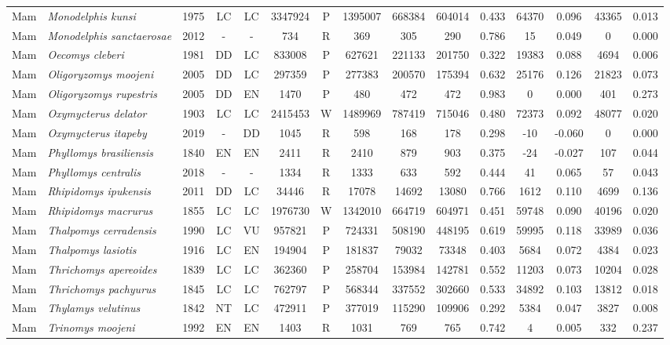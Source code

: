 \documentclass[12pt,openright,oneside,a4paper,english]{abntex2}
\begin{document}
\begin{landscape}
\begin{longtable}{llccccccccccccc}
		Mam&\textit{Monodelphis kunsi}&1975&LC&LC&3347924&P&1395007&668384&604014&0.433&64370&0.096&43365&0.013\\
		Mam&\textit{Monodelphis sanctaerosae}&2012&-&-&734&R&369&305&290&0.786&15&0.049&0&0.000\\
		Mam&\textit{Oecomys cleberi}&1981&DD&LC&833008&P&627621&221133&201750&0.322&19383&0.088&4694&0.006\\
		Mam&\textit{Oligoryzomys moojeni}&2005&DD&LC&297359&P&277383&200570&175394&0.632&25176&0.126&21823&0.073\\
		Mam&\textit{Oligoryzomys rupestris}&2005&DD&EN&1470&P&480&472&472&0.983&0&0.000&401&0.273\\
		Mam&\textit{Oxymycterus delator}&1903&LC&LC&2415453&W&1489969&787419&715046&0.480&72373&0.092&48077&0.020\\
		Mam&\textit{Oxymycterus itapeby}&2019&-&DD&1045&R&598&168&178&0.298&-10&-0.060&0&0.000\\
		Mam&\textit{Phyllomys brasiliensis}&1840&EN&EN&2411&R&2410&879&903&0.375&-24&-0.027&107&0.044\\
		Mam&\textit{Phyllomys centralis}&2018&-&-&1334&R&1333&633&592&0.444&41&0.065&57&0.043\\
		Mam&\textit{Rhipidomys ipukensis}&2011&DD&LC&34446&R&17078&14692&13080&0.766&1612&0.110&4699&0.136\\
		Mam&\textit{Rhipidomys macrurus}&1855&LC&LC&1976730&W&1342010&664719&604971&0.451&59748&0.090&40196&0.020\\
		Mam&\textit{Thalpomys cerradensis}&1990&LC&VU&957821&P&724331&508190&448195&0.619&59995&0.118&33989&0.036\\
		Mam&\textit{Thalpomys lasiotis}&1916&LC&EN&194904&P&181837&79032&73348&0.403&5684&0.072&4384&0.023\\
		Mam&\textit{Thrichomys apereoides}&1839&LC&LC&362360&P&258704&153984&142781&0.552&11203&0.073&10204&0.028\\
		Mam&\textit{Thrichomys pachyurus}&1845&LC&LC&762797&P&568344&337552&302660&0.533&34892&0.103&13812&0.018\\
		Mam&\textit{Thylamys velutinus}&1842&NT&LC&472911&P&377019&115290&109906&0.292&5384&0.047&3827&0.008\\
		Mam&\textit{Trinomys moojeni}&1992&EN&EN&1403&R&1031&769&765&0.742&4&0.005&332&0.237\\
	\end{longtable}

	\addtocounter{table}{-1}
	
\end{landscape}
\end{document}
